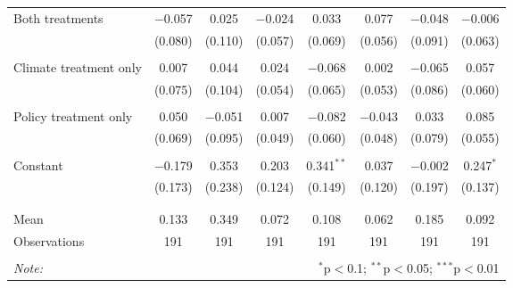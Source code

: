 \begin{tabular}{@{\extracolsep{5pt}}lccccccc}
 Both treatments & $-$0.057 & 0.025 & $-$0.024 & 0.033 & 0.077 & $-$0.048 & $-$0.006 \\ 
  & (0.080) & (0.110) & (0.057) & (0.069) & (0.056) & (0.091) & (0.063) \\ 
  & & & & & & & \\ 
 Climate treatment only & 0.007 & 0.044 & 0.024 & $-$0.068 & 0.002 & $-$0.065 & 0.057 \\ 
  & (0.075) & (0.104) & (0.054) & (0.065) & (0.053) & (0.086) & (0.060) \\ 
  & & & & & & & \\ 
 Policy treatment only & 0.050 & $-$0.051 & 0.007 & $-$0.082 & $-$0.043 & 0.033 & 0.085 \\ 
  & (0.069) & (0.095) & (0.049) & (0.060) & (0.048) & (0.079) & (0.055) \\ 
  & & & & & & & \\ 
 Constant & $-$0.179 & 0.353 & 0.203 & 0.341$^{**}$ & 0.037 & $-$0.002 & 0.247$^{*}$ \\ 
  & (0.173) & (0.238) & (0.124) & (0.149) & (0.120) & (0.197) & (0.137) \\ 
  & & & & & & & \\ 
\hline \\[-1.8ex] 
Mean & 0.133 & 0.349 & 0.072 & 0.108 & 0.062 & 0.185 & 0.092 \\ 
Observations & 191 & 191 & 191 & 191 & 191 & 191 & 191 \\ 
\hline 
\hline \\[-1.8ex] 
\textit{Note:}  & \multicolumn{7}{r}{$^{*}$p$<$0.1; $^{**}$p$<$0.05; $^{***}$p$<$0.01} \\ 
\end{tabular} 
